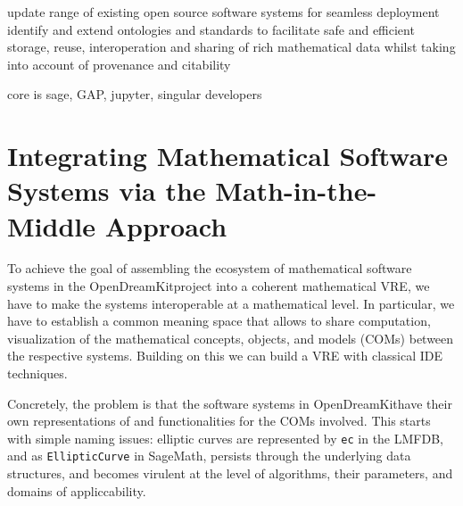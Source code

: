 \documentclass{llncs}
\def\pn{OpenDreamKit}
\begin{document}
update range of existing open source software systems for seamless deployment identify and
extend ontologies and standards to facilitate safe and efficient storage, reuse,
interoperation and sharing of rich mathematical data whilst taking into account of
provenance and citability

core is sage, GAP, jupyter, singular developers




\section{Integrating Mathematical Software Systems via the Math-in-the-Middle Approach}



To achieve the goal of assembling the ecosystem of mathematical software systems in the
\pn project into a coherent mathematical VRE, we have to make the systems interoperable at
a mathematical level. In particular, we have to establish a common meaning space that
allows to share computation, visualization of the mathematical concepts, objects, and
models (COMs) between the respective systems. Building on this we can build a VRE with
classical IDE techniques. 

Concretely, the problem is that the software systems in \pn have their own representations
of and functionalities for the COMs involved. This starts with simple naming issues:
elliptic curves are represented by \lstinline|ec| in the LMFDB, and as
\lstinline|EllipticCurve| in SageMath, persists through the underlying data structures,
and becomes virulent at the level of algorithms, their parameters, and domains of
appliccability.


\end{document}
